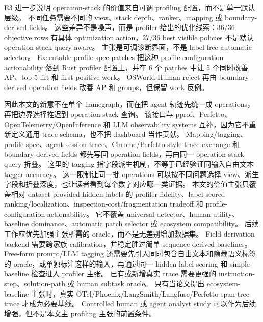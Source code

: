 \documentclass[10pt,twocolumn]{ctexart}
\begin{document}
E3 进一步说明 operation-stack 的价值来自可调 profiling 配置，而不是单一默认层级。
不同任务需要不同的 view、stack depth、ranker、mapping 或 boundary-derived fields。
这些差异不是噪声，而是 profiler 给出的优化线索：36/36 objective rows 有具体 optimization action，27/36 best visible policies 不是默认 operation-stack query-aware。
主张是可调诊断界面，不是 label-free automatic selector。
Executable profile-spec patches 把这种 profile-configuration actionability 落到 Rust profiler 配置上，并在 6 个 patches 中让 5 个同时改善 AP、top-5 lift 和 first-positive work。
OSWorld-Human reject 再由 boundary-derived operation fields 改善 AP 和 groups，但保留 work 反例。

因此本文的新意不在单个 flamegraph，而在把 agent 轨迹先统一成 operations，再把边界选择推迟到 operation-stack 查询。
该接口与 pprof、Perfetto、OpenTelemetry/OpenInference 和 LLM observability systems 互补，因为它不重新定义通用 trace schema，也不把 dashboard 当作贡献。
Mapping/tagging、profile spec、agent-session trace、Chrome/Perfetto-style trace exchange 和 boundary-derived fields 都先写回 operation fields，再由同一 operation-stack query 折叠。
这里的 tagging 指字段派生机制，不等于已经验证同输入自由文本 tagger accuracy。
这一限制让同一批 operations 可以按不同问题选择 view、派生字段和折叠深度，也让读者看到每个数字对应哪一类证据。
本文的价值主张只覆盖相对 dataset-provided hidden labels 的 profiler fidelity、label-scored ranking/localization、inspection-cost/fragmentation tradeoff 和 profile-configuration actionability。
它不覆盖 universal detector、human utility、baseline dominance、automatic patch selector 或 ecosystem compatibility。
后续工作应优先加强主张所需的 oracle，而不是无差别增加数据集。
Field-derivation backend 需要跨家族 calibration，并稳定胜过简单 sequence-derived baselines。
Free-form prompt/LLM tagging 还需要先引入同时包含自由文本和隐藏语义标签的 oracle，或单独标注这样的输入，再通过同一 hidden-label scoring 和 simple-baseline 检查进入 profiler 主张。
已有或新增真实 trace 需要更强的 instruction-step、solution-path 或 human subtask oracle。
只有当论文提出 ecosystem-baseline 主张时，真实 OTel/Phoenix/LangSmith/Langfuse/Perfetto span-tree trace 才成为必要基线。
Controlled human 或 agent analyst study 可以作为后续增强，但不是本文主 profiling 主张的前置条件。

\vspace{-0.8em}
\end{document}
